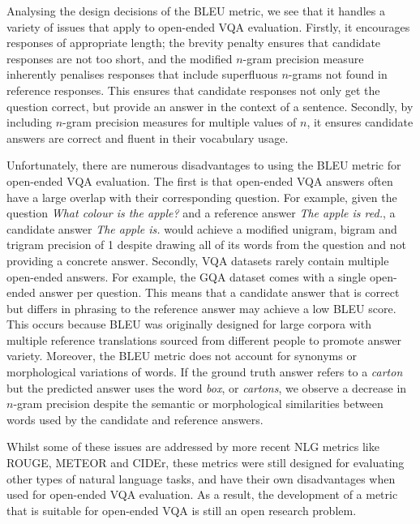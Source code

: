 Analysing the design decisions of the BLEU metric, we see that it handles a variety of issues that apply to open-ended VQA evaluation. Firstly, it encourages responses of appropriate length; the brevity penalty ensures that candidate responses are not too short, and the modified \(n\)-gram precision measure inherently penalises responses that include superfluous \(n\)-grams not found in reference responses. This ensures that candidate responses not only get the question correct, but provide an answer in the context of a sentence. Secondly, by including \(n\)-gram precision measures for multiple values of \(n\), it ensures candidate answers are correct and fluent in their vocabulary usage.

Unfortunately, there are numerous disadvantages to using the BLEU metric for open-ended VQA evaluation. The first is that open-ended VQA answers often have a large overlap with their corresponding question. For example, given the question \textit{What colour is the apple?} and a reference answer \textit{The apple is red.}, a candidate answer \textit{The apple is.} would achieve a modified unigram, bigram and trigram precision of 1 despite drawing all of its words from the question and not providing a concrete answer.
Secondly, VQA datasets rarely contain multiple open-ended answers. For example, the GQA dataset \cite{hudson2019gqa} comes with a single open-ended answer per question. This means that a candidate answer that is correct but differs in phrasing to the reference answer may achieve a low BLEU score. This occurs because BLEU was originally designed for large corpora with multiple reference translations sourced from different people to promote answer variety.
Moreover, the BLEU metric does not account for synonyms or morphological variations of words. If the ground truth answer refers to a \textit{carton} but the predicted answer uses the word \textit{box}, or \textit{cartons}, we observe a decrease in \(n\)-gram precision despite the semantic or morphological similarities between words used by the candidate and reference answers.

Whilst some of these issues are addressed by more recent NLG metrics like ROUGE, METEOR and CIDEr, these metrics were still designed for evaluating other types of natural language tasks, and have their own disadvantages when used for open-ended VQA evaluation. As a result, the development of a metric that is suitable for open-ended VQA is still an open research problem.



